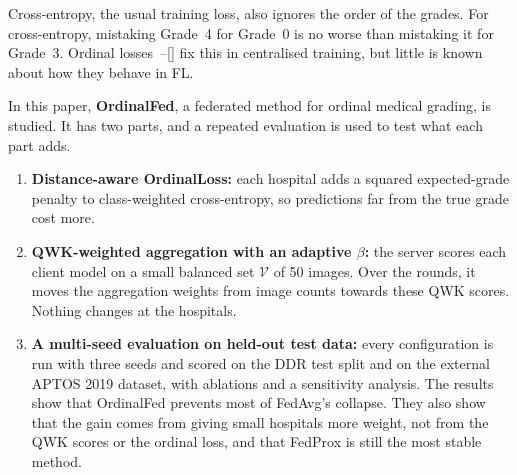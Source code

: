 Cross-entropy, the usual training loss, also ignores the order of the grades. For
cross-entropy, mistaking Grade~4 for Grade~0 is no worse than mistaking it for
Grade~3. Ordinal losses~\cite{toledocortes2022dqor}--[] fix
this in centralised training, but little is known about how they behave in FL.

In this paper, \textbf{OrdinalFed}, a federated method for ordinal medical grading,
is studied. It has two parts, and a repeated evaluation is used to test what each
part adds.
\begin{enumerate}[leftmargin=*]
  \item \textbf{Distance-aware OrdinalLoss:} each hospital adds a squared
  expected-grade penalty to class-weighted cross-entropy, so predictions far from
  the true grade cost more.
  \item \textbf{QWK-weighted aggregation with an adaptive $\beta$:} the server
  scores each client model on a small balanced set $\mathcal{V}$ of 50 images.
  Over the rounds, it moves the aggregation weights from image counts towards
  these QWK scores. Nothing changes at the hospitals.
  \item \textbf{A multi-seed evaluation on held-out test data:} every
  configuration is run with three seeds and scored on the DDR test split and on
  the external APTOS 2019 dataset, with ablations and a sensitivity analysis. The results show that OrdinalFed prevents
  most of FedAvg's collapse. They also show that the gain comes from giving small
  hospitals more weight, not from the QWK scores or the ordinal loss, and that
  FedProx is still the most stable method.
\end{enumerate}
